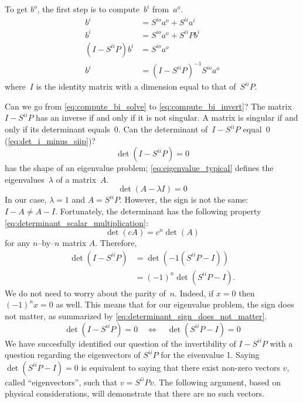 To get $b^o$, the first step is to compute~$b^i$ from~$a^o$.
\begin{subequations}
    \begin{align}
        b^i &= S^{io}a^o + S^{ii}a^i \label{eq:compute_bi_ai} \\
        b^i &= S^{io}a^o + S^{ii}Pb^i \label{eq:compute_bi_bi} \\
        (I - S^{ii}P)b^i &= S^{io}a^o \label{eq:compute_bi_solve} \\
        b^i &= (I - S^{ii}P)^{-1} S^{io}a^o \label{eq:compute_bi_invert}
    \end{align} \label{eq:compute_bi}
\end{subequations}
where~$I$ is the identity matrix with a dimension equal to that of~$S^{ii}P$.

Can we go from \cref{eq:compute_bi_solve} to \cref{eq:compute_bi_invert}?
The matrix~$I - S^{ii}P$ has an inverse if and only if it is not singular.
A matrix is singular if and only if its determinant equals~0.
Can the determinant of~$I - S^{ii}P$ equal~0 (\cref{eq:det_i_minus_siip})?
\begin{equation}
    \det(I - S^{ii}P) = 0 \label{eq:det_i_minus_siip}
\end{equation}
 has the shape of an eigenvalue problem;
\cref{eq:eigenvalue_typical} defines the eigenvalues~$\lambda$ of a matrix~$A$.
\begin{equation}
    \det(A - \lambda I) = 0 \label{eq:eigenvalue_typical}
\end{equation}
In our case, $\lambda=1$ and $A=S^{ii}P$.
However, the sign is not the same: $I-A \neq A-I$.
Fortunately, the determinant has the following property \cref{eq:determinant_scalar_multiplication}:
\begin{equation}
    \det(c A) = c^n \det(A) \label{eq:determinant_scalar_multiplication}
\end{equation}
for any $n$--by--$n$ matrix $A$.
Therefore,
\begin{subequations}
    \begin{align}
        \det(I - S^{ii}P)
        &= \det(-1(S^{ii}P - I)) \\
        &= (-1)^n \det(S^{ii}P - I) \text{.}
    \end{align}
\end{subequations}
We do not need to worry about the parity of~$n$.
Indeed, if $x=0$ then $(-1)^n x = 0$ as well.
This means that for our eigenvalue problem, the sign does not matter, as summarized by \cref{eq:determinant_sign_does_not_matter}.
\begin{equation}
    \det(I - S^{ii}P) = 0
    \quad
    \Longleftrightarrow
    \quad
    \det(S^{ii}P - I) = 0
    \label{eq:determinant_sign_does_not_matter}
\end{equation}
We have succesfully identified our question of the invertibility of $I - S^{ii}P$ with a question regarding the eigenvectors of $S^{ii}P$ for the eivenvalue 1.
Saying $\det(S^{ii}P - I) = 0$ is equivalent to saying that there exist non-zero vectors $v$, called ``eigenvectors'', such that $v = S^{ii}Pv$.
The following argument, based on physical considerations, will demonstrate that there are no such vectors.

